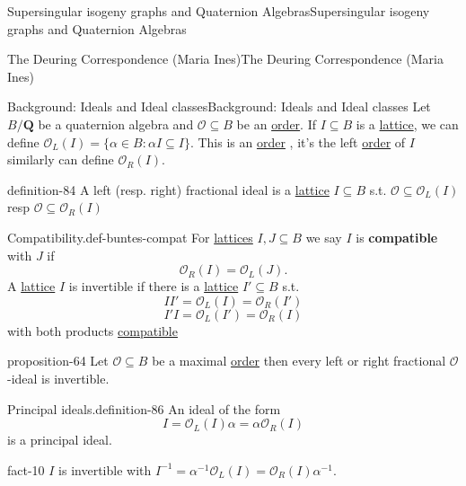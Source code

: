 \documentclass[10pt,]{book}
\newcommand{\terminology}[1]{\textbf{#1}}
\numberwithin{equation}{section}
\newcommand{\inv}{^{-1}}
\newcommand{\QQ}{\mathbf{Q}}
\newcommand{\ints}{\mathcal{O}}
\begin{document}
\begin{chapterptx}{Supersingular isogeny graphs and Quaternion Algebras}{}{Supersingular isogeny graphs and Quaternion Algebras}{}{}
\begin{sectionptx}{The Deuring Correspondence (Maria Ines)}{}{The Deuring Correspondence (Maria Ines)}{}{}
\begin{subsectionptx}{Background: Ideals and Ideal classes}{}{Background: Ideals and Ideal classes}{}{}
\hypertarget{p-938}{}%
Let \(B/\QQ\) be a quaternion algebra and  \(\ints \subseteq B\) be an \hyperref[def-order-quaternion]{order}. If \(I \subseteq B \) is a  \hyperref[def-buntes-lattice]{lattice}, we can define \(\ints_L (I) = \{ \alpha\in  B :  \alpha I  \subseteq I \}\). This is an \hyperref[def-order-quaternion]{order} , it's the left \hyperref[def-order-quaternion]{order} of  \(I\) similarly can define \(\ints_R (I) \).%
\begin{definition}{}{definition-84}%
\hypertarget{p-939}{}%
A left (resp. right) fractional ideal is a \hyperref[def-buntes-lattice]{lattice} \(I \subseteq B\) s.t. \(\ints \subseteq       \ints_L (I) \) resp \(\ints \subseteq \ints_R (I) \)%
\end{definition}
\begin{definition}{Compatibility.}{def-buntes-compat}%
\hypertarget{p-940}{}%
For \hyperref[def-buntes-lattice]{lattices} \(I,J \subseteq B\) we say \(I\) is \terminology{compatible} with \(J\) if%
\begin{equation*}
\ints_R(I)= \ints_L(J)\text{.}
\end{equation*}
A \hyperref[def-buntes-lattice]{lattice} \(I \) is invertible if there is a \hyperref[def-buntes-lattice]{lattice} \(I' \subseteq B\) s.t.%
\begin{equation*}
II' = \ints_L(I) =  \ints_R(I')
\end{equation*}
%
\begin{equation*}
I'I = \ints_L(I') =  \ints_R(I)
\end{equation*}
with both products \hyperref[def-buntes-compat]{compatible}%
\end{definition}
\begin{proposition}{}{}{proposition-64}%
\hypertarget{p-941}{}%
Let \(\ints \subseteq B\) be a maximal \hyperref[def-order-quaternion]{order} then every left or right fractional \(\ints\)-ideal is invertible.%
\end{proposition}
\begin{definition}{Principal ideals.}{definition-86}%
\hypertarget{p-942}{}%
An ideal of the form%
\begin{equation*}
I =  \ints_L(I) \alpha =  \alpha\ints_R(I)
\end{equation*}
is a principal ideal.%
\end{definition}
\begin{fact}{}{}{fact-10}%
\hypertarget{p-943}{}%
\(I \) is invertible with \(I\inv = \alpha \inv \ints_L(I) =  \ints_R(I) \alpha \inv\).%
\end{fact}

\end{subsectionptx}
\end{sectionptx}
\end{chapterptx}
\end{document}
